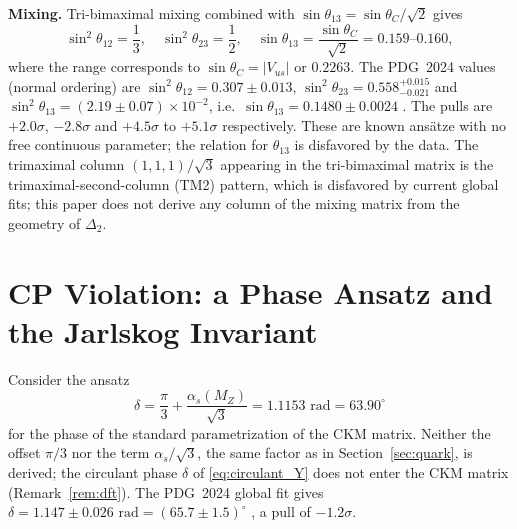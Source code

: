 \documentclass[11pt,reqno]{amsart}
\theoremstyle{definition}
\begin{document}
\textbf{Mixing.} Tri-bimaximal mixing \cite{harrison2002tribimaximal} combined with $\sin\theta_{13} = \sin\theta_C/\sqrt2$ \cite{king2012tbc} gives
\begin{equation}
    \sin^2 \theta_{12} = \frac{1}{3}, \quad \sin^2 \theta_{23} = \frac{1}{2}, \quad \sin \theta_{13} = \frac{\sin \theta_C}{\sqrt{2}} = 0.159\text{--}0.160,
\end{equation}
where the range corresponds to $\sin\theta_C = |V_{us}|$ or $0.2263$. The PDG~2024 values (normal ordering) are $\sin^2\theta_{12} = 0.307 \pm 0.013$, $\sin^2\theta_{23} = 0.558^{+0.015}_{-0.021}$ and $\sin^2\theta_{13} = (2.19 \pm 0.07)\times10^{-2}$, i.e.\ $\sin\theta_{13} = 0.1480 \pm 0.0024$ \cite{maki1962remarks,pdg2024}. The pulls are $+2.0\sigma$, $-2.8\sigma$ and $+4.5\sigma$ to $+5.1\sigma$ respectively. These are known ansätze with no free continuous parameter; the relation for $\theta_{13}$ is disfavored by the data. The trimaximal column $(1,1,1)/\sqrt3$ appearing in the tri-bimaximal matrix is the trimaximal-second-column (TM2) pattern, which is disfavored by current global fits; this paper does not derive any column of the mixing matrix from the geometry of $\Delta_2$.

\section{CP Violation: a Phase Ansatz and the Jarlskog Invariant}\label{sec:cp}

Consider the ansatz
\begin{equation}\label{eq:delta_ansatz}
    \delta = \frac{\pi}{3} + \frac{\alpha_s(M_Z)}{\sqrt{3}} = 1.1153\text{ rad} = 63.90^\circ
\end{equation}
for the phase of the standard parametrization of the CKM matrix. Neither the offset $\pi/3$ nor the term $\alpha_s/\sqrt3$, the same factor as in Section~\ref{sec:quark}, is derived; the circulant phase $\delta$ of \eqref{eq:circulant_Y} does not enter the CKM matrix (Remark~\ref{rem:dft}). The PDG~2024 global fit gives $\delta = 1.147 \pm 0.026\text{ rad} = (65.7 \pm 1.5)^\circ$ \cite{pdg2024}, a pull of $-1.2\sigma$.
\end{document}
